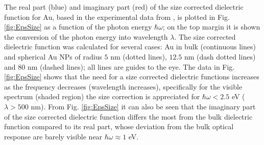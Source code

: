 The real part (blue) and imaginary part (red) of the size corrected dielectric function for Au, based in the experimental data from \citeauthor{johnson_optical_1972} \cite{johnson_optical_1972},  is plotted in Fig. \ref{fig:EpsSize} as a function of the photon energy $\hbar\omega$; on the top margin it is shown the conversion of the photon energy into wavelength $\lambda$. The size corrected dielectric function was calculated for several cases: Au in bulk (continuous lines) and  spherical Au NPs of radius $5$ nm (dotted lines), $12.5$ nm (dash dotted lines) and $80$ nm (dashed lines); all lines are guides to the eye. The data in  Fig. \ref{fig:EpsSize} shows that the need for a size corrected dielectric functions increases as the frequency decreases (wavelength increases), specifically for the visible spectrum (shaded region) the size correction is appreciated for $\hbar \omega < 2.5$ eV ($\lambda>500$ nm). From Fig. \ref{fig:EpsSize} it can also be seen that the imaginary part of the size corrected dielectric function differs the most from the bulk dielectric function compared to its real part, whose deviation from the bulk optical response are barely visible near $\hbar\omega\approx 1$ eV.
